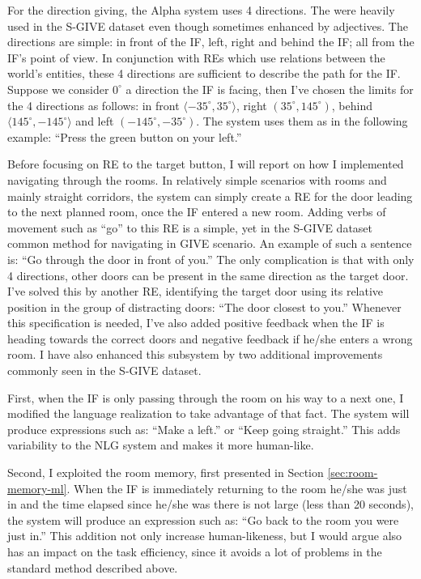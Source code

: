 For the direction giving, the Alpha system uses 4 directions. The were heavily used in the S-GIVE dataset even though sometimes enhanced by adjectives. The directions are simple: in front of the IF, left, right and behind the IF; all from the IF's point of view. In conjunction with REs which use relations between the world's entities, these 4 directions are sufficient to describe the path for the IF. Suppose we consider $0^{\circ}$ a direction the IF is facing, then I've chosen the limits for the 4 directions as follows: in front $\langle-35^{\circ},35^{\circ}\rangle$, right $(35^{\circ},145^{\circ})$, behind $\langle145^{\circ},-145^{\circ}\rangle$ and left $(-145^{\circ},-35^{\circ})$. The system uses them as in the following example: ``Press the green button on your left.''

Before focusing on RE to the target button, I will report on how I implemented navigating through the rooms. In relatively simple scenarios with rooms and mainly straight corridors, the system can simply create a RE for the door leading to the next planned room, once the IF entered a new room. Adding verbs of movement such as ``go'' to this RE is a simple, yet in the S-GIVE dataset common method for navigating in GIVE scenario. An example of such a sentence is: ``Go through the door in front of you.'' The only complication is that with only 4 directions, other doors can be present in the same direction as the target door. I've solved this by another RE, identifying the target door using its relative position in the group of distracting doors: ``The door closest to you.'' Whenever this specification is needed, I've also added positive feedback when the IF is heading towards the correct doors and negative feedback if he/she enters a wrong room. I have also enhanced this subsystem by two additional improvements commonly seen in the S-GIVE dataset.

First, when the IF is only passing through the room on his way to a next one, I modified the language realization to take advantage of that fact. The system will produce expressions such as: ``Make a left.'' or ``Keep going straight.'' This adds variability to the NLG system and makes it more human-like.

Second, I exploited the room memory, first presented in Section \ref{sec:room-memory-ml}. When the IF is immediately returning to the room he/she was just in and the time elapsed since he/she was there is not large (less than 20 seconds), the system will produce an expression such as: ``Go back to the room you were just in.'' This addition not only increase human-likeness, but I would argue also has an impact on the task efficiency, since it avoids a lot of problems in the standard method described above.

